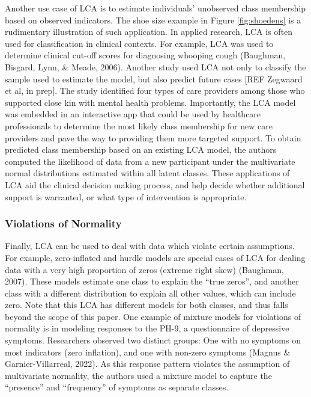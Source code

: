 \documentclass[
  ,man,floatsintext]{apa6}
\begin{document}
Another use case of LCA is to estimate individuals' unobserved class membership based on observed indicators.
The shoe size example in Figure \ref{fig:shoedens}
is a rudimentary illustration of such application.
In applied research, LCA is often used for classification in clinical contexts.
For example, LCA was used to determine clinical cut-off scores for diagnosing whooping cough (Baughman, Bisgard, Lynn, \& Meade, 2006).
Another study used LCA not only to classify the sample used to estimate the model, but also predict future cases {[}REF Zegwaard et al, in prep{]}.
The study identified four types of care providers among those who supported close kin with mental health problems.
Importantly, the LCA model was embedded in an interactive app that could be used by healthcare professionals to determine the most likely class membership for new care providers and pave the way to providing them more targeted support.
To obtain predicted class membership based on an existing LCA model,
the authors computed the likelihood of data from a new participant under the multivariate normal distributions estimated within all latent classes.
These applications of LCA aid the clinical decision making process,
and help decide whether additional support is warranted,
or what type of intervention is appropriate.

\hypertarget{violations-of-normality}{%
\subsubsection{Violations of Normality}\label{violations-of-normality}}

Finally, LCA can be used to deal with data which violate certain assumptions.
For example, zero-inflated and hurdle models are special cases of LCA for dealing data with a very high proportion of zeros (extreme right skew) (Baughman, 2007).
These models estimate one class to explain the ``true zeros'',
and another class with a different distribution to explain all other values, which can include zero.
Note that this LCA has different models for both classes,
and thus falls beyond the scope of this paper.
One example of mixture models for violations of normality
is in modeling responses to the PH-9, a questionnaire of depressive symptoms.
Researchers observed two distinct groups: One with no symptoms on most indicators (zero inflation),
and one with non-zero symptoms (Magnus \& Garnier-Villarreal, 2022).
As this response pattern violates the assumption of multivariate normality,
the authors used a mixture model to capture the ``presence'' and ``frequency'' of symptoms as separate classes.
\end{document}
